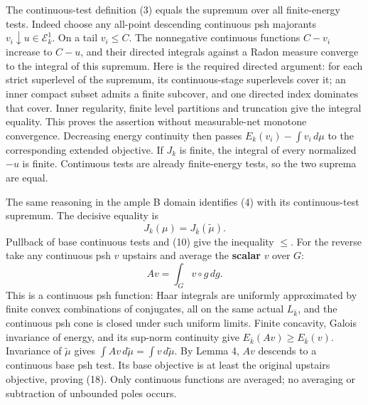 \documentclass[
  11pt,
]{article}
\begin{document}
The continuous-test definition (3) equals the supremum over all
finite-energy tests. Indeed choose any all-point descending continuous
psh majorants \(v_i\downarrow u\in\mathcal E^1_k\). On a tail
\(v_i\leq C\). The nonnegative continuous functions \(C-v_i\) increase
to \(C-u\), and their directed integrals against a Radon measure
converge to the integral of this supremum. Here is the required directed
argument: for each strict superlevel of the supremum, its
continuous-stage superlevels cover it; an inner compact subset admits a
finite subcover, and one directed index dominates that cover. Inner
regularity, finite level partitions and truncation give the integral
equality. This proves the assertion without measurable-net monotone
convergence. Decreasing energy continuity then passes
\(E_k(v_i)-\int v_i\,d\mu\) to the corresponding extended objective. If
\(J_k\) is finite, the integral of every normalized \(-u\) is finite.
Continuous tests are already finite-energy tests, so the two suprema are
equal.

The same reasoning in the ample B domain identifies (4) with its
continuous-test supremum. The decisive equality is \[
 J_k(\mu)=J_{\bar k}(\widetilde\mu).
 \tag{18}
\] Pullback of base continuous tests and (10) give the inequality
\(\leq\). For the reverse take any continuous psh \(v\) upstairs and
average the \textbf{scalar} \(v\) over \(G\): \[
 Av=\int_G v\circ g\,dg.
\] This is a continuous psh function: Haar integrals are uniformly
approximated by finite convex combinations of conjugates, all on the
same actual \(L_{\bar k}\), and the continuous psh cone is closed under
such uniform limits. Finite concavity, Galois invariance of energy, and
its sup-norm continuity give \(E_{\bar k}(Av)\geq E_{\bar k}(v)\).
Invariance of \(\widetilde\mu\) gives
\(\int Av\,d\widetilde\mu=\int v\,d\widetilde\mu\). By Lemma 4, \(Av\)
descends to a continuous base psh test. Its base objective is at least
the original upstairs objective, proving (18). Only continuous functions
are averaged; no averaging or subtraction of unbounded poles occurs.
\end{document}
